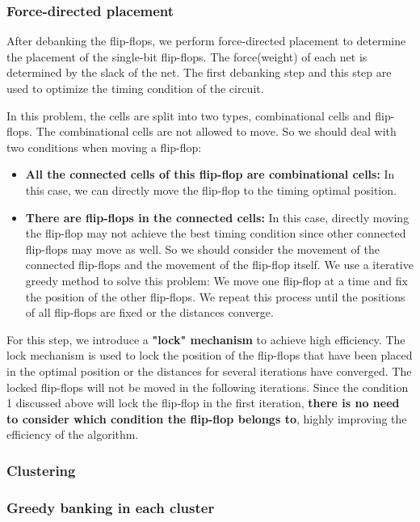 \documentclass[12pt]{article}
\begin{document}
\subsubsection{Force-directed placement}
After debanking the flip-flops, we perform force-directed placement to determine the placement of the single-bit flip-flops. The force(weight) of each net is determined by the slack of the net. The first debanking step and this step are used to optimize the timing condition of the circuit.

In this problem, the cells are split into two types, combinational cells and flip-flops. The combinational cells are not allowed to move. So we should deal with two conditions when moving a flip-flop:

\begin{itemize}
    \item \textbf{All the connected cells of this flip-flop are combinational cells:} In this case, we can directly move the flip-flop to the timing optimal position.
    \item \textbf{There are flip-flops in the connected cells:} In this case, directly moving the flip-flop may not achieve the best timing condition since other connected flip-flops may move as well. So we should consider the movement of the connected flip-flops and the movement of the flip-flop itself. We use a iterative greedy method to solve this problem: We move one flip-flop at a time and fix the position of the other flip-flops. We repeat this process until the positions of all flip-flops are fixed or the distances converge.
\end{itemize}

For this step, we introduce a \textbf{"lock" mechanism} to achieve high efficiency. The lock mechanism is used to lock the position of the flip-flops that have been placed in the optimal position or the distances for several iterations have converged. The locked flip-flops will not be moved in the following iterations. Since the condition 1 discussed above will lock the flip-flop in the first iteration, \textbf{there is no need to consider which condition the flip-flop belongs to}, highly improving the efficiency of the algorithm.

\subsubsection{Clustering}

\subsubsection{Greedy banking in each cluster}
\end{document}
